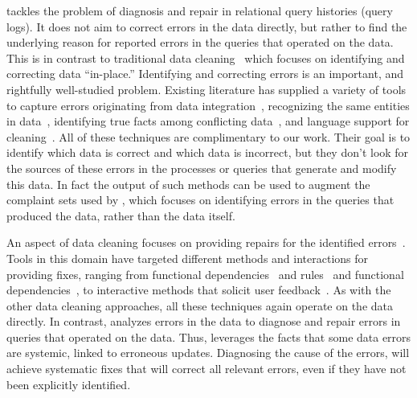 \iffalse  
\sys tackles the problem of diagnosis and repair in relational query
histories (query logs). It does not aim to correct errors in the data
directly, but rather to find the underlying reason for reported errors
in the queries that operated on the data. This is in contrast to
traditional data 
cleaning~\cite{dallachiesa2013nadeef, rahm00, Raman01, Kalashnikov06, Fan2008b
} which focuses on identifying and correcting data
``in-place.'' Identifying and correcting errors is an important, and
rightfully well-studied problem. Existing literature has supplied a
variety of tools to capture errors originating from data
integration~\cite{Abiteboul99%
},
recognizing the same entities in data~\cite{Koudas2006, GruenheidDS14
}, identifying true facts among conflicting
data~\cite{yin2008truth, DN09, ltm2012
}, and language support for
cleaning~\cite{Galhardas2000}. All of these techniques are
complimentary to our work. Their goal is to identify which data is
correct and which data is incorrect, but they don't look for the
sources of these errors in the processes or queries that generate and
modify this data. In fact the output of such methods can be used to
augment the complaint sets used by \sys, which focuses on identifying
errors in the queries that produced the data, rather than the data
itself.

An aspect of data cleaning focuses on providing repairs for the
identified errors~\cite{ChuIP13}. Tools in this domain have targeted
different methods and interactions for providing fixes, ranging from
functional dependencies~\cite{Fan2008b, ChuIP13
} and
rules~\cite{Beskales2010, Cong2007
} and functional
dependencies~\cite{Fan2008b, ChuIP13
}, to interactive methods that
solicit user feedback~\cite{Yakout, Raman01
}. As with the other data
cleaning approaches, all these techniques again operate on the data
directly. In contrast, \sys analyzes errors in the data to diagnose
and repair errors in queries that operated on the data. Thus, \sys
leverages the facts that some data errors are systemic, linked to
erroneous updates. Diagnosing the cause of the errors, will achieve
systematic fixes that will correct all relevant errors, even if they
have not been explicitly identified.


